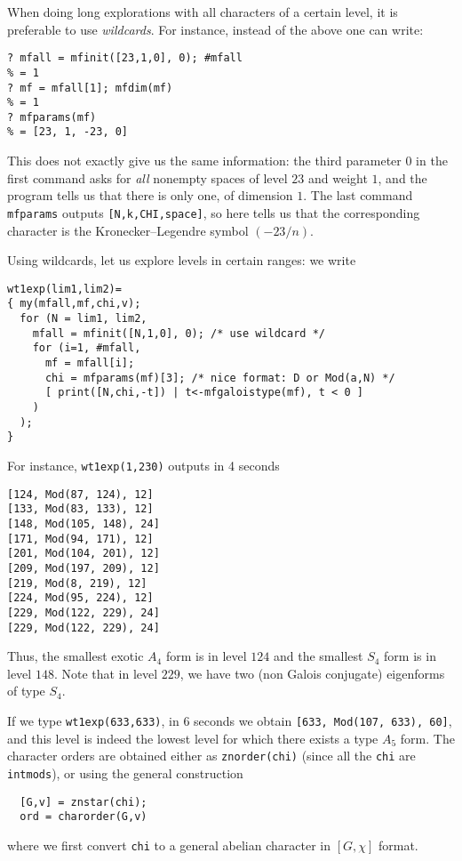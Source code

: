 \documentclass[11pt]{article}
\def\kbd#1{{\tt #1}}
\begin{document}
When doing long explorations with all characters of a certain level, it
is preferable to use \emph{wildcards}. For instance, instead of the above
one can write:

\begin{verbatim}
? mfall = mfinit([23,1,0], 0); #mfall
% = 1
? mf = mfall[1]; mfdim(mf)
% = 1
? mfparams(mf)
% = [23, 1, -23, 0]
\end{verbatim}

This does not exactly give us the same information: the third parameter $0$
in the first command asks for \emph{all} nonempty spaces of level $23$ and
weight $1$, and the program tells us that there is only one, of dimension $1$.
The last command \kbd{mfparams} outputs \kbd{[N,k,CHI,space]}, so here tells
us that the corresponding character is the Kronecker--Legendre symbol $(-23/n)$.

Using wildcards, let us explore levels in certain ranges: we write
\begin{verbatim}
wt1exp(lim1,lim2)=
{ my(mfall,mf,chi,v);
  for (N = lim1, lim2,
    mfall = mfinit([N,1,0], 0); /* use wildcard */
    for (i=1, #mfall,
      mf = mfall[i];
      chi = mfparams(mf)[3]; /* nice format: D or Mod(a,N) */
      [ print([N,chi,-t]) | t<-mfgaloistype(mf), t < 0 ]
    )
  );
}
\end{verbatim}

For instance, \kbd{wt1exp(1,230)} outputs in 4 seconds

\begin{verbatim}
[124, Mod(87, 124), 12]
[133, Mod(83, 133), 12]
[148, Mod(105, 148), 24]
[171, Mod(94, 171), 12]
[201, Mod(104, 201), 12]
[209, Mod(197, 209), 12]
[219, Mod(8, 219), 12]
[224, Mod(95, 224), 12]
[229, Mod(122, 229), 24]
[229, Mod(122, 229), 24]
\end{verbatim}

Thus, the smallest exotic $A_4$ form is in level $124$ and the smallest $S_4$
form is in level $148$. Note that in level $229$, we have two (non Galois
conjugate) eigenforms of type $S_4$.

If we type \kbd{wt1exp(633,633)}, in 6 seconds we obtain \kbd{[633, Mod(107,
633), 60]}, and this level is indeed the lowest level for which there exists
a type $A_5$ form. The character orders are obtained either as
\kbd{znorder(chi)} (since all the \kbd{chi} are \kbd{intmods}), or
using the general construction
\begin{verbatim}
  [G,v] = znstar(chi);
  ord = charorder(G,v)
\end{verbatim}
where we first convert \kbd{chi} to a general abelian character in
$[G,\chi]$ format.
\end{document}
